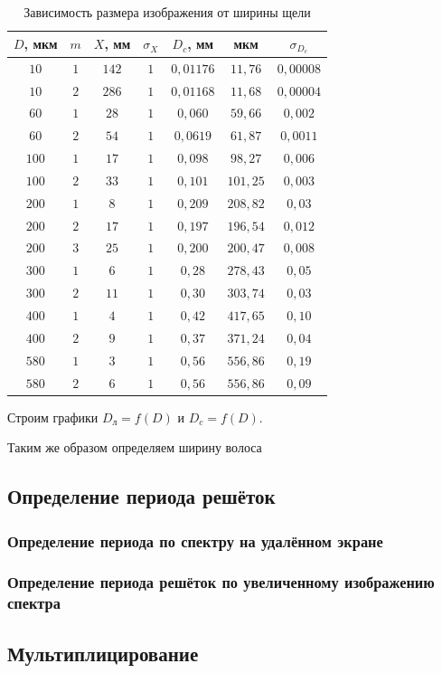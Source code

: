 \documentclass[a5paper,10pt, twoside]{article} %
\begin{document}
	\begin{table}[h]
		\begin{center}
			\begin{tabular}{| c | c | c | c | c | c | c |}
			\hline
			$D$, мкм & $m$ & $X$, мм & $\sigma_X$ & $D_c$, мм & мкм & $\sigma_{D_c}$\\
			\hline
			$10$ & $1$ & $142$ & $1$ & $0,01176$ & $11,76$ & $0,00008$\\
			\hline
			$10$ & $2$ & $286$ & $1$ & $0,01168$ & $11,68$ & $0,00004$\\
			\hline
			$60$ & $1$ & $28$ & $1$ & $0,060$ & $59,66$ & $0,002$\\
			\hline
			$60$ & $2$ & $54$ & $1$ & $0,0619$ & $61,87$ & $0,0011$\\
			\hline
			$100$ & $1$ & $17$ & $1$ & $0,098$ & $98,27$ & $0,006$\\
			\hline
			$100$ & $2$ & $33$ & $1$ & $0,101$ & $101,25$ & $0,003$\\
			\hline
			$200$ & $1$ & $8$ & $1$ & $0,209$ & $208,82$ & $0,03$\\
			\hline
			$200$ & $2$ & $17$ & $1$ & $0,197$ & $196,54$ & $0,012$\\
			\hline
			$200$ & $3$ & $25$ & $1$ & $0,200$ & $200,47$ & $0,008$\\
			\hline
			$300$ & $1$ & $6$ & $1$ & $0,28$ & $278,43$ & $0,05$\\
			\hline
			$300$ & $2$ & $11$ & $1$ & $0,30$ & $303,74$ & $0,03$\\
			\hline
			$400$ & $1$ & $4$ & $1$ & $0,42$ & $417,65$ & $0,10$\\
			\hline
			$400$ & $2$ & $9$ & $1$ & $0,37$ & $371,24$ & $0,04$\\
			\hline
			$580$ & $1$ & $3$ & $1$ & $0,56$ & $556,86$ & $0,19$\\
			\hline
			$580$ & $2$ & $6$ & $1$ & $0,56$ & $556,86$ & $0,09$\\
			\hline
			\end{tabular}
		\end{center}
		\caption{Зависимость размера изображения от ширины щели}
	\end{table}

	Строим графики $D_{\text{л}} = f(D)$ и $D_c = f(D)$.


	Таким же образом определяем ширину волоса


\subsection{Определение периода решёток}

	\subsubsection{Определение периода по спектру на удалённом экране}

	\subsubsection{Определение периода решёток по увеличенному изображению спектра}

\subsection{Мультиплицирование}

	
\end{document}
